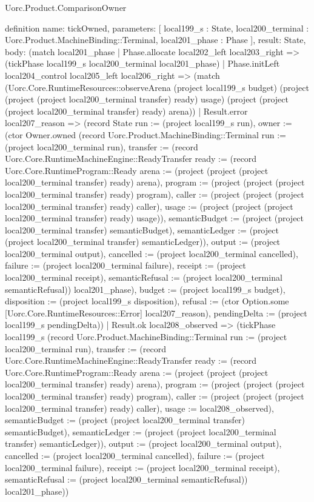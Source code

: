 \begin{lexlean}{Uorc.Product.ComparisonOwner}
\begin{semanticmodule}
definition{
  name: tickOwned,
  parameters: [
    local199_s : State,
    local200_terminal : Uorc.Product.MachineBinding::Terminal,
    local201_phase : Phase
  ],
  result: State,
  body: (match local201_phase
    | Phase.allocate local202_left local203_right => (tickPhase local199_s local200_terminal local201_phase)
    | Phase.initLeft local204_control local205_left local206_right => (match (Uorc.Core.RuntimeResources::observeArena (project local199_s budget) (project (project (project local200_terminal transfer) ready) usage) (project (project (project local200_terminal transfer) ready) arena))
      | Result.error local207_reason => (record State {run := (project local199_s run), owner := (ctor Owner.owned (record Uorc.Product.MachineBinding::Terminal {run := (project local200_terminal run), transfer := (record Uorc.Core.RuntimeMachineEngine::ReadyTransfer {ready := (record Uorc.Core.RuntimeProgram::Ready {arena := (project (project (project local200_terminal transfer) ready) arena), program := (project (project (project local200_terminal transfer) ready) program), caller := (project (project (project local200_terminal transfer) ready) caller), usage := (project (project (project local200_terminal transfer) ready) usage)}), semanticBudget := (project (project local200_terminal transfer) semanticBudget), semanticLedger := (project (project local200_terminal transfer) semanticLedger)}), output := (project local200_terminal output), cancelled := (project local200_terminal cancelled), failure := (project local200_terminal failure), receipt := (project local200_terminal receipt), semanticRefusal := (project local200_terminal semanticRefusal)}) local201_phase), budget := (project local199_s budget), disposition := (project local199_s disposition), refusal := (ctor Option.some [Uorc.Core.RuntimeResources::Error] local207_reason), pendingDelta := (project local199_s pendingDelta)})
      | Result.ok local208_observed => (tickPhase local199_s (record Uorc.Product.MachineBinding::Terminal {run := (project local200_terminal run), transfer := (record Uorc.Core.RuntimeMachineEngine::ReadyTransfer {ready := (record Uorc.Core.RuntimeProgram::Ready {arena := (project (project (project local200_terminal transfer) ready) arena), program := (project (project (project local200_terminal transfer) ready) program), caller := (project (project (project local200_terminal transfer) ready) caller), usage := local208_observed}), semanticBudget := (project (project local200_terminal transfer) semanticBudget), semanticLedger := (project (project local200_terminal transfer) semanticLedger)}), output := (project local200_terminal output), cancelled := (project local200_terminal cancelled), failure := (project local200_terminal failure), receipt := (project local200_terminal receipt), semanticRefusal := (project local200_terminal semanticRefusal)}) local201_phase))
}
\end{semanticmodule}
\end{lexlean}
